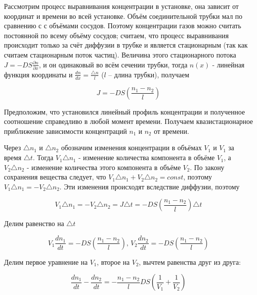 \documentclass[a4paper, 12pt]{article} %
\begin{document}
Рассмотрим процесс выравнивания концентрации в установке, она зависит от координат и времени во всей установке. Объём соединительной трубки мал по сравнению с с объёмами сосудов. Поэтому концентрации газов можно считать постоянной по всему объёму сосудов; считаем, что процесс выравнивания происходит только за счёт диффузии в трубке и является стационарным (так как считаем стационарным поток частиц). Величина этого стационарного потока $J = -DS\frac{\partial n}{\partial x}$, и он одинаковый во всём сечении трубки, тогда $n(x)$ - линейная функция координаты и $\frac{dn}{dx} = \frac{\triangle n}{l}$ ($l$ -- длина трубки), получаем 

\begin{equation}
	J = -DS \left( \frac{n_1-n_2}{l} \right)
\end{equation}

Предположим, что установился линейный профиль концентрации и полученное соотношение справедливо в любой момент времени. Получаем квазистационарное приближение зависимости концентраций $n_1$ и $n_2$ от времени.

Через $\triangle n_1$ и $\triangle n_2$ обозначим изменения концентрации в объёмах $V_1$ и $V_1$ за время $\triangle t$. Тогда $V_1 \triangle n_1$ - изменение количества компонента в объёме $V_1$, а $V_2 \triangle n_2$ - изменение количества этого компонента в объёме $V_2$. По закону сохранения вещества следует, что $V_1 \triangle n_1 + V_2 \triangle n_2 = const$, поэтому $V_1 \triangle n_1 = - V_2 \triangle n_2$. Эти изменения происходят вследствие диффузии, поэтому

\begin{equation}
	V_1 \triangle n_1 = - V_2 \triangle n_2 = J \triangle t = -DS   \left( \frac{n_1-n_2}{l} \right) \triangle t
\end{equation}

Делим равенство на $\triangle t$

\begin{equation}
	V_1 \frac{dn_1}{dt} = -DS \left( \frac{n_1-n_2}{l} \right) \text{, } V_2 \frac{dn_2}{dt} = -DS \left( \frac{n_1-n_2}{l}\right)
\end{equation}

Делим первое уравнение на $V_1$, второе на $V_2$, вычтем равенства друг из друга:

\begin{equation}
	\frac{dn_1}{dt}- \frac{dn_2}{dt} = - \frac{n_1-n_2}{l}DS \left( \frac{1}{V_1} +\frac{1}{V_2} \right)
\end{equation}
\end{document}
